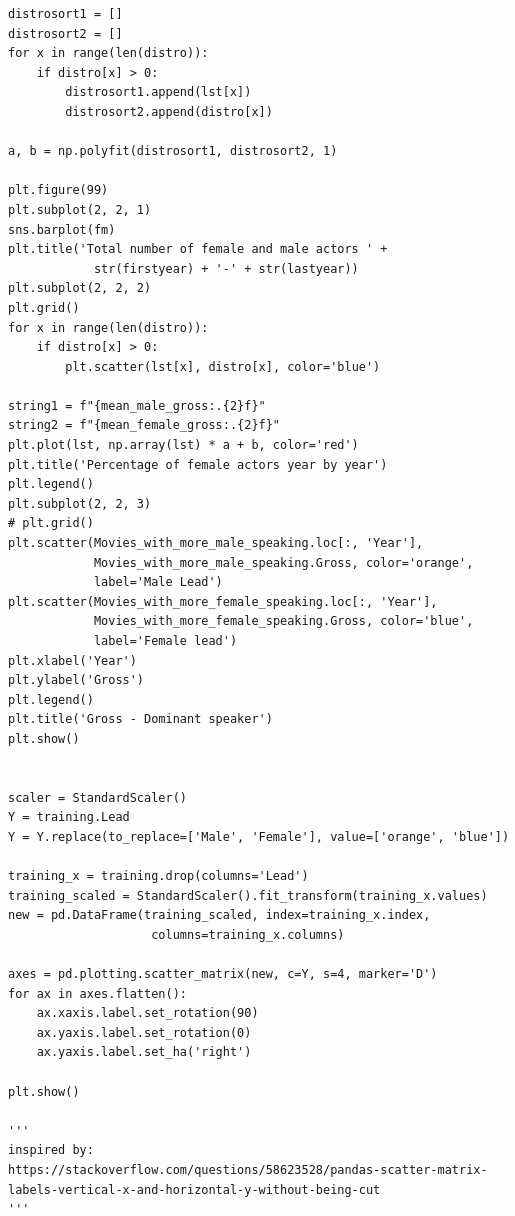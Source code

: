 \documentclass{article}
\begin{document}
\begin{verbatim}
distrosort1 = []
distrosort2 = []
for x in range(len(distro)):
    if distro[x] > 0:
        distrosort1.append(lst[x])
        distrosort2.append(distro[x])

a, b = np.polyfit(distrosort1, distrosort2, 1)

plt.figure(99)
plt.subplot(2, 2, 1)
sns.barplot(fm)
plt.title('Total number of female and male actors ' + 
            str(firstyear) + '-' + str(lastyear))
plt.subplot(2, 2, 2)
plt.grid()
for x in range(len(distro)):
    if distro[x] > 0:
        plt.scatter(lst[x], distro[x], color='blue')

string1 = f"{mean_male_gross:.{2}f}"
string2 = f"{mean_female_gross:.{2}f}"
plt.plot(lst, np.array(lst) * a + b, color='red')
plt.title('Percentage of female actors year by year')
plt.legend()
plt.subplot(2, 2, 3)
# plt.grid()
plt.scatter(Movies_with_more_male_speaking.loc[:, 'Year'], 
            Movies_with_more_male_speaking.Gross, color='orange',
            label='Male Lead')
plt.scatter(Movies_with_more_female_speaking.loc[:, 'Year'], 
            Movies_with_more_female_speaking.Gross, color='blue',
            label='Female lead')
plt.xlabel('Year')
plt.ylabel('Gross')
plt.legend()
plt.title('Gross - Dominant speaker')
plt.show()


scaler = StandardScaler()
Y = training.Lead
Y = Y.replace(to_replace=['Male', 'Female'], value=['orange', 'blue'])

training_x = training.drop(columns='Lead')
training_scaled = StandardScaler().fit_transform(training_x.values)
new = pd.DataFrame(training_scaled, index=training_x.index, 
                    columns=training_x.columns)

axes = pd.plotting.scatter_matrix(new, c=Y, s=4, marker='D')
for ax in axes.flatten():
    ax.xaxis.label.set_rotation(90)
    ax.yaxis.label.set_rotation(0)
    ax.yaxis.label.set_ha('right')

plt.show()

'''
inspired by:
https://stackoverflow.com/questions/58623528/pandas-scatter-matrix-
labels-vertical-x-and-horizontal-y-without-being-cut
'''
\end{verbatim}
\end{document}
